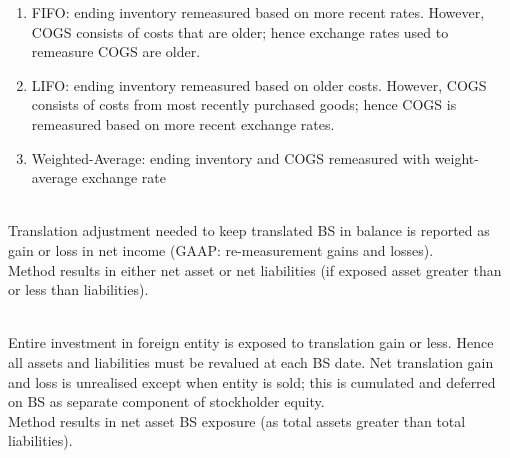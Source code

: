 \begin{remark} 
\begin{enumerate}[label=\roman*.]
\setlength{\itemsep}{0pt}
\item FIFO: ending inventory remeasured based on more recent rates. However, COGS consists of costs that are older; hence exchange rates used to remeasure COGS are older.
\item LIFO: ending inventory remeasured based on older costs. However, COGS consists of costs from most recently purchased goods; hence COGS is remeasured based on more recent exchange rates.
\item Weighted-Average: ending inventory and COGS remeasured with weight-average exchange rate
\end{enumerate}
\end{remark}

\begin{remark} \\
Translation adjustment needed to keep translated BS in balance is reported as gain or loss in net income (GAAP: re-measurement gains and losses).\\
Method results in either net asset or net liabilities (if exposed asset greater than or less than liabilities).
\end{remark}

\begin{remark} \\
Entire investment in foreign entity is exposed to translation gain or less. Hence all assets and liabilities must be revalued at each BS date. Net translation gain and loss is unrealised except when entity is sold; this is cumulated and deferred on BS as separate component of stockholder equity.\\
Method results in net asset BS exposure (as total assets greater than total liabilities).
\end{remark}


